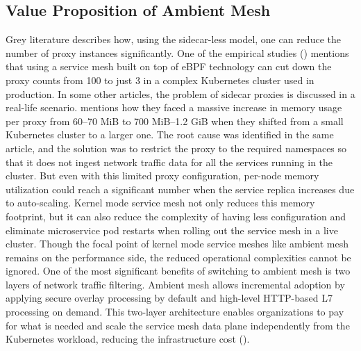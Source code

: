 \subsection{Value Proposition of Ambient Mesh}
Grey literature describes how, using the sidecar-less model, one can reduce the number of proxy instances significantly. One of the empirical studies (\cite{thenewstackRice2021}) mentions that using a service mesh built on top of eBPF technology can cut down the proxy counts from 100 to just 3 in a complex Kubernetes cluster used in production. In some other articles, the problem of sidecar proxies is discussed in a real-life scenario. \cite{mediumSinghal2021} mentions how they faced a massive increase in memory usage per proxy from 60–70 MiB to 700 MiB–1.2 GiB when they shifted from a small Kubernetes cluster to a larger one. The root cause was identified in the same article, and the solution was to restrict the proxy to the required namespaces so that it does not ingest network traffic data for all the services running in the cluster. But even with this limited proxy configuration, per-node memory utilization could reach a significant number when the service replica increases due to auto-scaling. Kernel mode service mesh not only reduces this memory footprint, but it can also reduce the complexity of having less configuration and eliminate microservice pod restarts when rolling out the service mesh in a live cluster. Though the focal point of kernel mode service meshes like ambient mesh remains on the performance side, the reduced operational complexities cannot be ignored. One of the most significant benefits of switching to ambient mesh is two layers of network traffic filtering. Ambient mesh allows incremental adoption by applying secure overlay processing by default and high-level HTTP-based L7 processing on demand. This two-layer architecture enables organizations to pay for what is needed and scale the service mesh data plane independently from the Kubernetes workload, reducing the infrastructure cost (\cite{infoqSunCampbell2023}).

